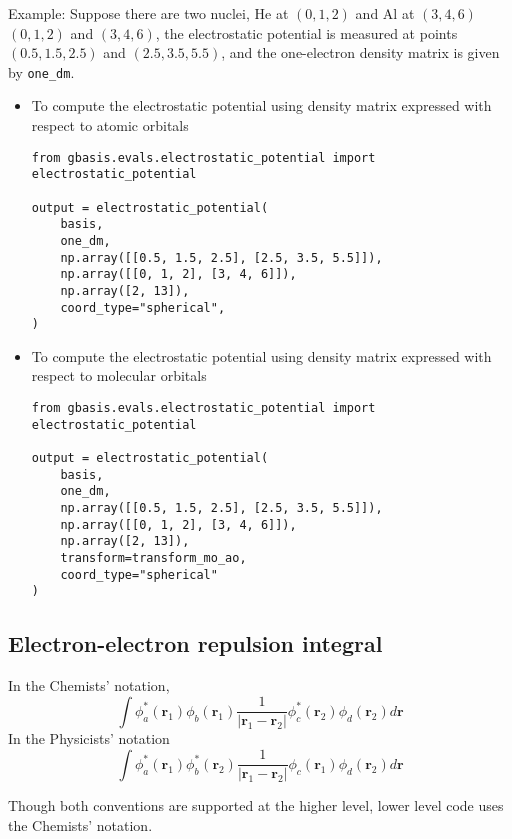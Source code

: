 \documentclass[letterpaper]{article}
\begin{document}
Example:
Suppose there are two nuclei, He at $(0, 1, 2)$ and Al at $(3, 4, 6)$
$(0, 1, 2)$ and $(3, 4, 6)$, the electrostatic potential is measured at
points $(0.5, 1.5, 2.5)$ and $(2.5, 3.5, 5.5)$, and the one-electron density
matrix is given by \verb|one_dm|.
\begin{itemize}
\item To compute the electrostatic potential using density matrix expressed with
  respect to atomic orbitals
  \begin{lstlisting}[xleftmargin=-25pt]
from gbasis.evals.electrostatic_potential import electrostatic_potential

output = electrostatic_potential(
    basis,
    one_dm,
    np.array([[0.5, 1.5, 2.5], [2.5, 3.5, 5.5]]),
    np.array([[0, 1, 2], [3, 4, 6]]),
    np.array([2, 13]),
    coord_type="spherical",
)
\end{lstlisting}
\item To compute the electrostatic potential using density matrix expressed with
  respect to molecular orbitals
  \begin{lstlisting}[xleftmargin=-25pt]
from gbasis.evals.electrostatic_potential import electrostatic_potential

output = electrostatic_potential(
    basis,
    one_dm,
    np.array([[0.5, 1.5, 2.5], [2.5, 3.5, 5.5]]),
    np.array([[0, 1, 2], [3, 4, 6]]),
    np.array([2, 13]),
    transform=transform_mo_ao,
    coord_type="spherical"
)
\end{lstlisting}
\end{itemize}
\subsection{Electron-electron repulsion integral}
In the Chemists' notation,
\begin{equation}
  \label{eq:elec_repulsion}
  \int \phi^*_a(\mathbf{r}_1) \phi_b(\mathbf{r}_1)
  \frac{1}{|\mathbf{r}_1 - \mathbf{r}_2|}
  \phi^*_c(\mathbf{r}_2) \phi_d(\mathbf{r}_2) d\mathbf{r}
\end{equation}
In the Physicists' notation
\begin{equation}
  \label{eq:elec_repulsion_phys}
  \int \phi^*_a(\mathbf{r}_1) \phi^*_b(\mathbf{r}_2)
  \frac{1}{|\mathbf{r}_1 - \mathbf{r}_2|}
  \phi_c(\mathbf{r}_1) \phi_d(\mathbf{r}_2) d\mathbf{r}
\end{equation}

Though both conventions are supported at the higher level, lower level code uses
the Chemists' notation.
\end{document}
